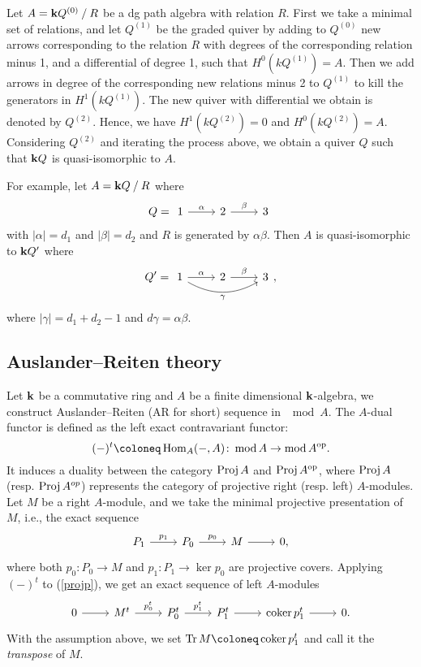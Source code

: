 \begin{construction}\cite[Construction 2.2]{Op}
  Let $A = \mathbf{k} Q^{(0)} \mathbin{/} R$ be a dg path algebra with relation $R$.
  First we take a minimal set of relations,
  and let $Q^{(1)}$ be the graded quiver by adding to $Q^{(0)}$
  new arrows corresponding to the relation $R$
  with degrees of the corresponding relation minus 1,
  and a differential of degree 1, such that $H^0(kQ^{(1)}) = A$.
  Then we add arrows in degree of the corresponding new relations minus 2
  to $Q^{(1)}$ to kill the generators in $H^1(kQ^{(1)})$.
  The new quiver with differential we obtain is denoted by $Q^{(2)}$.
  Hence, we have $H^1(kQ^{(2)}) = 0$ and $H^0(kQ^{(2)}) = A$.
  Considering $Q^{(2)}$ and iterating the process above,
  we obtain a quiver $Q$ such that $\mathbf{k} Q$ is quasi-isomorphic to $A$.\label{Opp}
\end{construction}
For example, let $A = \mathbf{k} Q \mathbin{/} R$ where
\[
  Q = 
  \begin{tikzcd}
    1 \ar[r, "\alpha"] & 2 \ar[r, "\beta"] & 3
  \end{tikzcd}
\]
with $|\alpha| = d_1$ and $|\beta| = d_2$ and $R$ is generated by $\alpha\beta$.
Then $A$ is quasi-isomorphic to $\mathbf{k} Q'$ where
\[
  Q' =
  \begin{tikzcd}
    1 \ar[r, "\alpha"] \arrow[rr, bend right, "\gamma"'] & 2 \ar[r, "\beta"] & 3
  \end{tikzcd},
\]
where $|\gamma| = d_1+d_2-1$ and $d\gamma = \alpha\beta$.
\subsection{Auslander--Reiten theory}
Let $\mathbf{k}$ be a commutative ring and $A$ be a finite dimensional $\mathbf{k}$-algebra,
we construct Auslander--Reiten (AR for short) sequence in $\mod A$.
The $A$-dual functor is defined as the left exact contravariant functor:
\[ (-)^{t} \coloneq \Hom_A(-, A) \colon \mod A \to \mod A^{\rm op}. \]
It induces a duality between the category $\operatorname{Proj} A$ and $\operatorname{Proj} A^{\rm op}$,
where $\operatorname{Proj} A$ (resp. $\operatorname{Proj} A^{op}$) represents
the category of projective right (resp. left) $A$-modules.
Let $M$ be a right $A$-module,
and we take the minimal projective presentation of $M$, i.e., the exact sequence
\begin{equation}\label{projp}
  \begin{tikzcd}
    P_1 \rar{p_1} & P_0 \rar{p_0} & M \rar & 0,
  \end{tikzcd}
\end{equation}
where both $p_0: P_0 \to M$ and $p_1: P_1 \to \ker p_0$ are projective covers. Applying $(-)^{t}$ to (\ref{projp}), we get an exact sequence of left $A$-modules
\begin{equation}
  \begin{tikzcd}
    0 \ar[r] & M^t \ar[r, "p_0^t"] & P_0^t \ar[r, "p_1^t"]
             & P_1^t \ar[r] & \coker p_1^t \ar[r] & 0.
  \end{tikzcd}
\end{equation}
With the assumption above,
we set $\Tr M \coloneq \coker p_1^t$ and call it the \textit{transpose} of $M$.

